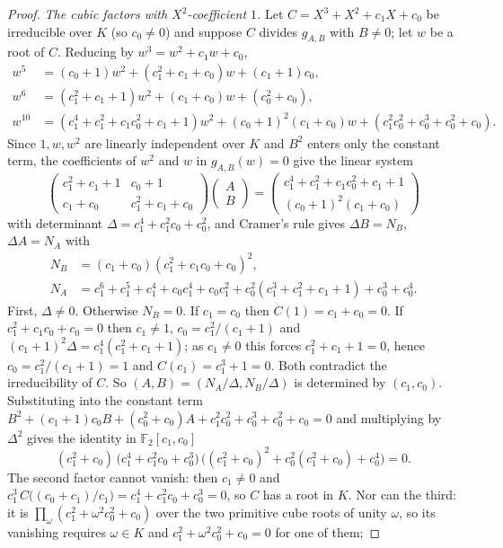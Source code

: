 \documentclass[11pt,a4paper]{amsart}
\theoremstyle{definition}
\theoremstyle{remark}
\newcommand{\F}{\mathbb{F}}
\begin{document}
\begin{proof}
\emph{The cubic factors with $X^2$-coefficient $1$.} Let $C=X^3+X^2+c_1X+c_0$ be irreducible over $K$ (so
$c_0\ne0$) and suppose $C$ divides $g_{A,B}$ with $B\ne0$; let $w$ be a root of $C$. Reducing by
$w^3=w^2+c_1w+c_0$,
\begin{align*}
w^5&=(c_0+1)w^2+(c_1^2+c_1+c_0)w+(c_1+1)c_0,\\
w^6&=(c_1^2+c_1+1)w^2+(c_1+c_0)w+(c_0^2+c_0),\\
w^{10}&=(c_1^4+c_1^2+c_1c_0^2+c_1+1)w^2+(c_0+1)^2(c_1+c_0)w+(c_1^2c_0^2+c_0^3+c_0^2+c_0).
\end{align*}
Since $1,w,w^2$ are linearly independent over $K$ and $B^2$ enters only the constant term, the coefficients of $w^2$
and $w$ in $g_{A,B}(w)=0$ give the linear system
\[
\begin{pmatrix}c_1^2+c_1+1&c_0+1\\ c_1+c_0&c_1^2+c_1+c_0\end{pmatrix}\begin{pmatrix}A\\B\end{pmatrix}
=\begin{pmatrix}c_1^4+c_1^2+c_1c_0^2+c_1+1\\ (c_0+1)^2(c_1+c_0)\end{pmatrix}
\]
with determinant $\Delta=c_1^4+c_1^2c_0+c_0^2$, and Cramer's rule gives $\Delta B=N_B$, $\Delta A=N_A$ with
\begin{align*}
N_B&=(c_1+c_0)(c_1^2+c_1c_0+c_0)^2,\\
N_A&=c_1^6+c_1^5+c_1^4+c_0c_1^4+c_0c_1^2+c_0^2(c_1^3+c_1^2+c_1+1)+c_0^3+c_0^4 .
\end{align*}
First, $\Delta\ne0$. Otherwise $N_B=0$. If $c_1=c_0$ then $C(1)=c_1+c_0=0$. If $c_1^2+c_1c_0+c_0=0$ then
$c_1\ne1$, $c_0=c_1^2/(c_1+1)$ and $(c_1+1)^2\Delta=c_1^4(c_1^2+c_1+1)$; as $c_1\ne0$ this forces $c_1^2+c_1+1=0$,
hence $c_0=c_1^2/(c_1+1)=1$ and $C(c_1)=c_1^3+1=0$. Both contradict the irreducibility of $C$. So
$(A,B)=(N_A/\Delta,N_B/\Delta)$ is determined by $(c_1,c_0)$. Substituting into the constant term
$B^2+(c_1+1)c_0B+(c_0^2+c_0)A+c_1^2c_0^2+c_0^3+c_0^2+c_0=0$ and multiplying by $\Delta^2$ gives the identity in
$\F_2[c_1,c_0]$
\[
(c_1^2+c_0)\,\bigl(c_1^4+c_1^2c_0+c_0^3\bigr)\,\bigl((c_1^2+c_0)^2+c_0^2(c_1^2+c_0)+c_0^4\bigr)=0 .
\]
The second factor cannot vanish: then $c_1\ne0$ and $c_1^3\,C\bigl((c_0+c_1)/c_1\bigr)=c_1^4+c_1^2c_0+c_0^3=0$, so
$C$ has a root in $K$. Nor can the third: it is $\prod_\omega(c_1^2+\omega^2c_0^2+c_0)$ over the two primitive cube
roots of unity $\omega$, so its vanishing requires $\omega\in K$ and $c_1^2+\omega^2c_0^2+c_0=0$ for one of them;

\end{proof}
\end{document}
